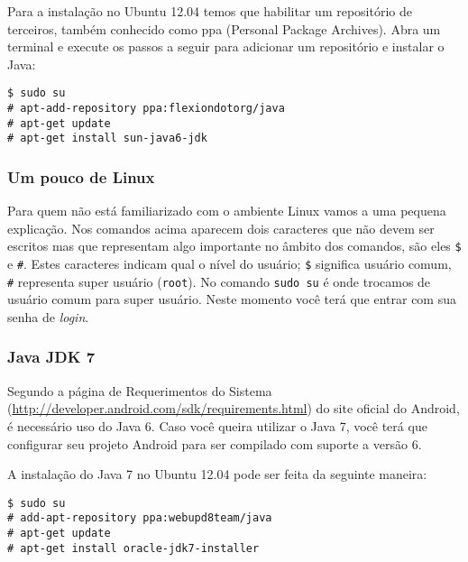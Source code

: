 Para a instalação no Ubuntu 12.04 temos que habilitar um repositório de terceiros, também conhecido como
\gls{ppa} (Personal Package Archives). Abra um terminal e execute os passos a seguir para adicionar um
repositório e instalar o Java:

\begin{flushleft}\texttt{\$ sudo su\\
\# apt-add-repository ppa:flexiondotorg/java\\
\# apt-get update\\
\# apt-get install sun-java6-jdk\\}
\end{flushleft}

\subsubsection{Um pouco de Linux}

Para quem não está familiarizado com o ambiente Linux vamos a uma pequena explicação. Nos comandos
acima aparecem dois caracteres que não devem ser escritos mas que representam algo importante no âmbito
dos comandos, são eles \texttt{\$} e \texttt{\#}. Estes caracteres indicam qual o nível do usuário;
\texttt{\$} significa usuário comum, \texttt{\#} representa super usuário (\texttt{root}). No comando
\texttt{sudo su} é onde trocamos de usuário comum para super usuário. Neste momento você terá que entrar
com sua senha de \textit{login}.

\subsubsection{Java JDK 7}

Segundo a página de Requerimentos do Sistema (\url{http://developer.android.com/sdk/requirements.html})
do site oficial do Android, é necessário uso do Java 6. Caso você queira utilizar o Java 7, você
terá que configurar seu projeto Android para ser compilado com suporte a versão 6.

A instalação do Java 7 no Ubuntu 12.04 pode ser feita da seguinte maneira:

\begin{flushleft}\texttt{\$ sudo su\\
\# add-apt-repository ppa:webupd8team/java\\
\# apt-get update\\
\# apt-get install oracle-jdk7-installer\\}
\end{flushleft}

